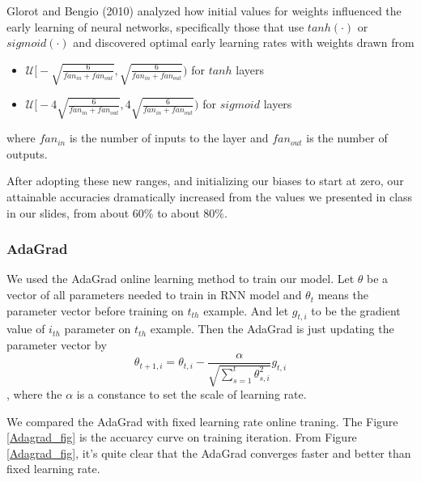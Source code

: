 \documentclass[11pt]{article}
\begin{document}
Glorot and Bengio (2010) analyzed how initial values for weights influenced the early learning of neural networks, specifically those that use $tanh(\cdot)$ or $sigmoid(\cdot)$ and discovered optimal early learning rates with weights drawn from
\begin{itemize}
\item $\mathcal{U}\Big[-\sqrt{\frac{6}{fan_{in}+fan_{out}}},\sqrt{\frac{6}{fan_{in}+fan_{out}}}\Big)$ for $tanh$ layers
\item $\mathcal{U}\Big[-4\sqrt{\frac{6}{fan_{in}+fan_{out}}},4\sqrt{\frac{6}{fan_{in}+fan_{out}}}\Big)$ for $sigmoid$ layers
\end{itemize}
where $fan_{in}$ is the number of inputs to the layer and $fan_{out}$ is the number of outputs.

After adopting these new ranges, and initializing our biases to start at zero, our attainable accuracies dramatically increased from the values we presented in class in our slides, from about $60\%$ to about $80\%$.

\subsubsection{AdaGrad}
We used the AdaGrad online learning method to train our model. Let $\theta$ be a vector of all parameters needed to train in RNN model and $\theta_t$ means the parameter vector before training on $t_{th}$ example. And let  $g_{t,i}$ to be the gradient value of $i_{th}$ parameter on $t_{th}$ example. Then the AdaGrad is just updating the parameter vector by
$$\theta_{{t+1},i} = \theta_{{t},i}  - \frac{\alpha}{\sqrt{\sum_{s=1}^t \theta_{{s},i}^2 }} g_{t,i}$$,
where the $\alpha$ is a constance to set the scale of learning rate.

We compared the AdaGrad with fixed learning rate online traning. The Figure \ref{Adagrad_fig} is the accuarcy curve on training iteration. From Figure \ref{Adagrad_fig}, it's quite clear that the AdaGrad converges faster and better than fixed learning rate.
\end{document}

